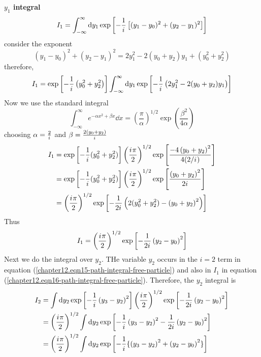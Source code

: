 	\textbf{$y_1$ integral}\\
	\begin{equation}
		I_1 = \int_{-\infty}^{\infty} \dd{y_1} \exp\left[-\frac{1}{{i\mkern1mu}} \left[(y_1 - y_0)^2 + (y_2 - y_1)^2\right]\right]
	\end{equation}
	consider the exponent
	\begin{equation}
		(y_1 - y_0)^2 + (y_2 - y_1)^2 = 2 y_1^2 - 2 (y_0 + y_2) y_1 + (y_0^2+y_2^2)
	\end{equation}
	therefore,
	\begin{equation}
		I_1 = \exp \left[-\frac{1}{{i\mkern1mu}} \left(y_0^2+ y_2^2\right)\right] \int_{-\infty}^{\infty} \dd{y_1} \exp\left[-\frac{1}{{i\mkern1mu}} \left(2y_1^2 - 2(y_0 + y_2) y_1\right)
		\right]
	\end{equation}
	Now we use the standard integral
	\begin{equation}
		\int_{-\infty}^{\infty} e^{-\alpha x^2 + \beta x} \dd{x} = \left(\frac{\pi}{\alpha}\right)^{1/2} \exp \left(\frac{\beta^2}{4\alpha}\right)
	\end{equation}
	choosing $\alpha = \frac{2}{{i\mkern1mu}}$ and $\beta = \frac{2(y_0 + y_2)}{{i\mkern1mu}}$
	\begin{align*}
		I_1 
		&= \exp \left[-\frac{1}{{i\mkern1mu}} (y_0^2 + y_2^2)\right] \left(\frac{{i\mkern1mu} \pi}{2}\right)^{1/2} \exp\left[\frac{-4 \left(y_0 +y_2\right)^2}{4 (2/{i\mkern1mu})}\right]\\
		&= \exp \left[-\frac{1}{{i\mkern1mu}} (y_0^2 + y_2^2)\right] \left(\frac{{i\mkern1mu} \pi}{2}\right)^{1/2} \exp\left[\frac{\left(y_0 +y_2\right)^2}{2{i\mkern1mu}}\right] \\
		&= \left(\frac{{i\mkern1mu} \pi}{2}\right)^{1/2} \exp \left[-\frac{1}{2{i\mkern1mu}} \left( 2(y_0^2 + y_2^2) - \left(y_0 +y_2\right)^2 \right)\right]
	\end{align*}
	Thus
	\begin{equation}
		I_1 = \left(\frac{{i\mkern1mu} \pi}{2}\right)^{1/2} \exp \left[-\frac{1}{2{i\mkern1mu}} \left(y_2 - y_0\right)^2\right]
		\label{chapter12.eqn16-path-integral-free-particle}
	\end{equation}
	Next we do the integral over $y_2$. THe variable $y_2$ occurs in the $i=2$ term in equation (\ref{chapter12.eqn15-path-integral-free-particle}) and also in $I_1$ in equation (\ref{chapter12.eqn16-path-integral-free-particle}). Therefore, the $y_2$ integral is
	\begin{align*}
		I_2 
		&= \int \dd{y_2} \exp \left[-\frac{1}{{i\mkern1mu}} \left(y_3 - y_2\right)^2\right] \left(\frac{{i\mkern1mu} \pi}{2}\right)^{1/2} \exp \left[-\frac{1}{2 {i\mkern1mu}} \left(y_2 - y_0\right)^2\right] \\
		&= \left(\frac{{i\mkern1mu} \pi}{2}\right)^{1/2} \int \dd{y_2} \exp \left[-\frac{1}{{i\mkern1mu}} \left(y_3 - y_2\right)^2 -\frac{1}{2 {i\mkern1mu}} \left(y_2 - y_0\right)^2\right] \\
		&= \left(\frac{{i\mkern1mu} \pi}{2}\right)^{1/2} \int \dd{y_2} \exp \left[-\frac{1}{{i\mkern1mu}} \{\left(y_3 - y_2\right)^2 + \left(y_2 - y_0\right)^2\}\right] \\
	\end{align*}
